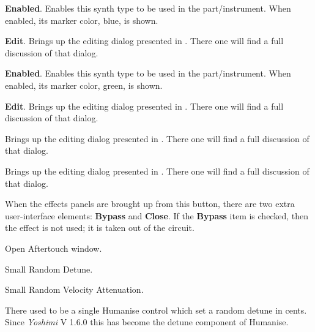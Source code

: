 
   \begin{enumber}
      \item \textbf{Enabled}.
      Enables this synth type to be used in the part/instrument.
      When enabled, its marker color, blue, is shown.
      \item \textbf{Edit}.
      Brings up the editing dialog presented in
      .
      There one will find a full discussion of that dialog.
   \end{enumber}


   \begin{enumber}
      \item \textbf{Enabled}.
      Enables this synth type to be used in the part/instrument.
      When enabled, its marker color, green, is shown.
      \item \textbf{Edit}.
      Brings up the editing dialog presented in
      .
      There one will find a full discussion of that dialog.
   \end{enumber}

   Brings up the editing dialog presented in
   .
   There one will find a full discussion of that dialog.

   Brings up the editing dialog presented in
   .
   There one will find a full discussion of that dialog.

   When the effects panels are brought up from this button, there are two extra
   user-interface elements:
   \textbf{Bypass} and \textbf{Close}.
   If the \textbf{Bypass} item is checked, then the effect is not
   used; it is taken out of the circuit.

   Open Aftertouch window.

   Small Random Detune.

   Small Random Velocity Attenuation.

   There used to be a single Humanise control which set a random detune in cents.
   Since \textsl{Yoshimi} V 1.6.0 this has become the detune component of Humanise.

